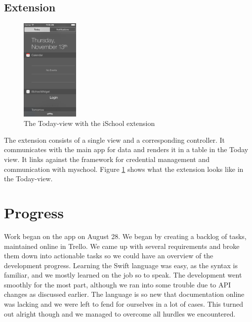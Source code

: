 \documentclass[pdftex, DIV=calc, paper=a4, fontsize=11pt, twocolumn]{scrartcl}	 %
\begin{document}
\subsection*{Extension}

\begin{figure}
    \centering
    \includegraphics[width=0.25\textwidth]{Todayview-ph.png}
    \caption{The Today-view with the iSchool extension}
    \label{fig:today}
\end{figure}

The extension consists of a single view and a corresponding controller. It communicates with the
main app for data and renders it in a table in the Today view. It links against the framework for 
credential management and communication with myschool. Figure \ref{fig:today} shows what the
extension looks like in the Today-view.


\section*{Progress}

Work began on the app on August 28. We began by creating a backlog of tasks, maintained online in
Trello. We came up with several requirements and broke them down into actionable tasks so we could
have an overview of the development progress. Learning the Swift language was easy, as the syntax
is familiar, and we mostly learned on the job so to speak. The development went smoothly for the
most part, although we ran into some trouble due to API changes as discussed earlier. The language
is so new that documentation online was lacking and we were left to fend for ourselves in a lot of 
cases. This turned out alright though and we managed to overcome all hurdles we encountered.
\end{document}
